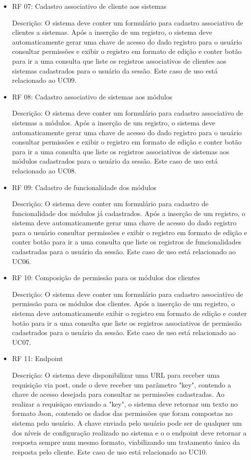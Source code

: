 \begin{itemize}
\item RF 07: Cadastro associativo de cliente aos sistemas


Descrição: O sistema deve conter um formulário para cadastro associativo de clientes a sistemas. Após a inserção de um registro, o sistema deve automaticamente gerar uma chave de acesso do dado registro para o usuário consultar permissões e exibir o registro em formato de edição e conter botão para ir a uma consulta que liste os registros associativos de clientes aos sistemas cadastrados para o usuário da sessão. Este caso de uso está relacionado ao UC09.


\item RF 08: Cadastro associativo de  sistemas aos módulos


Descrição: O sistema deve conter um formulário para cadastro associativo de sistemas a módulos. Após a inserção de um registro, o sistema deve automaticamente gerar uma chave de acesso do dado registro para o usuário consultar permissões e exibir o registro em formato de edição e conter botão para ir a uma consulta que liste os registros associativos de  sistemas aos módulos cadastrados para o usuário da sessão. Este caso de uso está relacionado ao UC08.


\item RF 09: Cadastro de funcionalidade dos módulos


Descrição: O sistema deve conter um formulário para cadastro de funcionalidade dos módulos já cadastrados. Após a inserção de um registro, o sistema deve automaticamente gerar uma chave de acesso do dado registro para o usuário consultar permissões e exibir o registro em formato de edição e conter botão para ir a uma consulta que liste os registros de funcionalidades cadastradas para o usuário da sessão. Este caso de uso está relacionado ao UC06.


\item RF 10: Composição de permissão para os módulos dos clientes


Descrição: O sistema deve conter um formulário para cadastro associativo de permissão para os módulos dos clientes. Após a inserção de um registro, o sistema deve automaticamente exibir o registro em formato de edição e conter botão para ir a uma consulta que liste os registros associativos de permissão cadastrados para o usuário da sessão. Este caso de uso está relacionado ao UC07.


\item RF 11: Endpoint


Descrição: O sistema deve disponibilizar uma URL para receber uma requisição via post, onde o deve receber um parâmetro "key", contendo a chave de acesso desejada para consultar as permissões cadastradas. Ao realizar a requisiçao enviando a "key", o sistema deve retornar um texto no formato Json, contendo os dados das permissões que foram compostas no sistema pelo usuário. A chave enviada pelo usuário pode ser de qualquer um dos níveis de configuração realizado no sistema e o o endpoint deve retornar a resposta sempre num mesmo formato, viabilizando um tratamento único da resposta pelo cliente. Este caso de uso está relacionado ao UC10.


\end{itemize}

